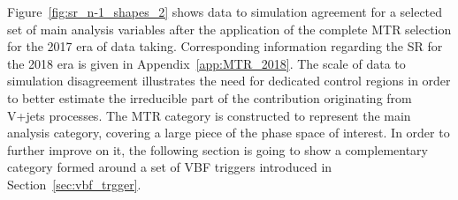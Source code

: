 \hspace{10pt} Figure~\ref{fig:sr_n-1_shapes_2} shows data to simulation agreement for a selected set of main analysis variables after the application of the complete MTR selection for the 2017 era of data taking. Corresponding information regarding the SR for the 2018 era is given in Appendix~\ref{app:MTR_2018}. The scale of data to simulation disagreement illustrates the need for dedicated control regions in order to better estimate the irreducible part of the contribution originating from V+jets processes. The MTR category is constructed to represent the main analysis category, covering a large piece of the phase space of interest. In order to further improve on it, the following section is going to show a complementary category formed around a set of VBF triggers introduced in Section~\ref{sec:vbf_trgger}.

